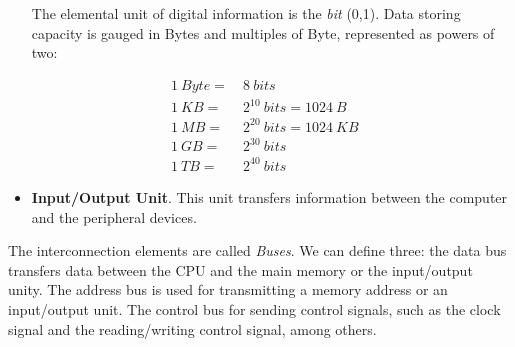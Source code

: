\begin{paracol}{2}
\begin{itemize}
The elemental unit of digital information is the \emph{bit} (0,1). Data storing capacity is gauged in Bytes  and multiples of Byte, represented as powers of two:

\begin{align} \nonumber
1\  Byte = &\ 8\ bits\ &\  \\ \nonumber
1\  KB  = &\ 2^{10}\ bits=1024\ B&\ \\  \nonumber
1\  MB = &\ 2^{20}\ bits=1024\ KB&\ \\  \nonumber
1\  GB = &\ 2^{30}\ bits &\ \\  \nonumber
1\  TB  = &\ 2^{40}\ bits\ &\
\end{align} 

\item \textbf{Input/Output Unit}. This unit transfers information between the computer and the peripheral devices.
\end{itemize}

The interconnection elements are called \emph{Buses}. We can define three: the data bus transfers data between the CPU and the main memory or the input/output unity. The address bus is used for transmitting a memory address or an input/output unit. The control bus for sending control signals, such as the clock signal and the reading/writing control signal, among others.     
\end{paracol} 


